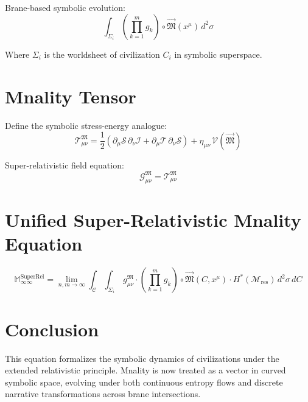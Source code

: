 \documentclass{article}
\begin{document}
Brane-based symbolic evolution:
\[
\int_{\Sigma_i} \left( \prod_{k=1}^m g_k \right) \circ \vec{\mathfrak{M}}(x^\mu) \, d^2 \sigma
\]

Where \( \Sigma_i \) is the worldsheet of civilization \( C_i \) in symbolic superspace.

\section{Mnality Tensor}
Define the symbolic stress-energy analogue:
\[
\mathcal{T}_{\mu\nu}^{\mathfrak{M}} = \frac{1}{2} \left( \partial_\mu \mathcal{S} \, \partial_\nu \mathcal{I} + \partial_\mu \mathcal{T} \, \partial_\nu \mathcal{S} \right) + \eta_{\mu\nu} \, \mathcal{V}(\vec{\mathfrak{M}})
\]

Super-relativistic field equation:
\[
\mathcal{G}_{\mu\nu}^{\mathfrak{M}} = \mathcal{T}_{\mu\nu}^{\mathfrak{M}}
\]

\section{Unified Super-Relativistic Mnality Equation}
\[
\boxed{
\mathbb{M}_{\infty\infty}^{\text{SuperRel}} =
\lim_{n,m \to \infty}
\int_{\mathcal{C}} \int_{\Sigma_i}
\, g_{\mu\nu}^{\mathfrak{M}} \cdot
\left(
\prod_{k=1}^m g_k
\right)
\circ \vec{\mathfrak{M}}(C, x^\mu)
\cdot
H^*(\mathcal{M}_{\text{res}})
\, d^2 \sigma \, dC
}
\]

\section{Conclusion}
This equation formalizes the symbolic dynamics of civilizations under the extended relativistic principle. Mnality is now treated as a vector in curved symbolic space, evolving under both continuous entropy flows and discrete narrative transformations across brane intersections.
\end{document}
